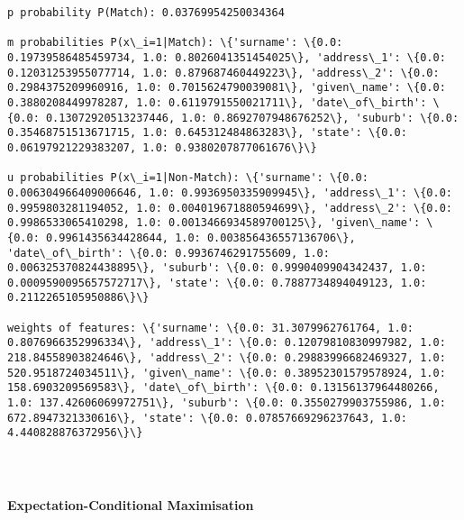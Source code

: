 \documentclass{article}
\begin{document}
    \begin{Verbatim}[commandchars=\\\{\}]
p probability P(Match): 0.03769954250034364

m probabilities P(x\_i=1|Match): \{'surname': \{0.0: 0.19739586485459734, 1.0: 0.8026041351454025\}, 'address\_1': \{0.0: 0.12031253955077714, 1.0: 0.879687460449223\}, 'address\_2': \{0.0: 0.2984375209960916, 1.0: 0.7015624790039081\}, 'given\_name': \{0.0: 0.3880208449978287, 1.0: 0.6119791550021711\}, 'date\_of\_birth': \{0.0: 0.13072920513237446, 1.0: 0.8692707948676252\}, 'suburb': \{0.0: 0.35468751513671715, 1.0: 0.645312484863283\}, 'state': \{0.0: 0.06197921229383207, 1.0: 0.9380207877061676\}\}

u probabilities P(x\_i=1|Non-Match): \{'surname': \{0.0: 0.006304966409006646, 1.0: 0.9936950335909945\}, 'address\_1': \{0.0: 0.9959803281194052, 1.0: 0.004019671880594699\}, 'address\_2': \{0.0: 0.9986533065410298, 1.0: 0.0013466934589700125\}, 'given\_name': \{0.0: 0.9961435634428644, 1.0: 0.003856436557136706\}, 'date\_of\_birth': \{0.0: 0.9936746291755609, 1.0: 0.006325370824438895\}, 'suburb': \{0.0: 0.9990409904342437, 1.0: 0.0009590095657572717\}, 'state': \{0.0: 0.7887734894049123, 1.0: 0.2112265105950886\}\}

weights of features: \{'surname': \{0.0: 31.3079962761764, 1.0: 0.8076966352996334\}, 'address\_1': \{0.0: 0.12079810830997982, 1.0: 218.84558903824646\}, 'address\_2': \{0.0: 0.29883996682469327, 1.0: 520.9518724034511\}, 'given\_name': \{0.0: 0.38952301579578924, 1.0: 158.6903209569583\}, 'date\_of\_birth': \{0.0: 0.13156137964480266, 1.0: 137.42606069972751\}, 'suburb': \{0.0: 0.3550279903755986, 1.0: 672.8947321330616\}, 'state': \{0.0: 0.07857669296237643, 1.0: 4.440828876372956\}\}

    \end{Verbatim}

    \begin{Verbatim}[commandchars=\\\{\}]

\end{Verbatim}

    \begin{Verbatim}[commandchars=\\\{\}]

\end{Verbatim}
\begin{Verbatim}[commandchars=\\\{\}]

\end{Verbatim}
    \hypertarget{expectation-conditional-maximisation}{%
\paragraph{Expectation-Conditional
Maximisation}\label{expectation-conditional-maximisation}}
\end{document}
